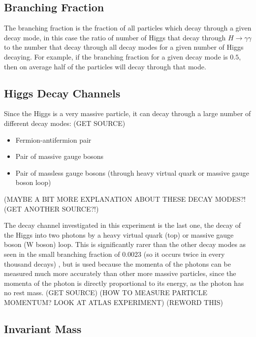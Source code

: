 \documentclass[11pt]{amsart}
\begin{document}
\begin{multicols}{2}
\subsection{Branching Fraction}
\label{sec:branching}

The branching fraction is the fraction of all particles which decay through a given decay mode, in this case the ratio of number of Higgs that decay through $H \to \gamma\gamma$ to the number that decay through all decay modes for a given number of Higgs decaying. For example, if the branching fraction for a given decay mode is $0.5$, then on average half of the particles will decay through that mode.

\subsection{Higgs Decay Channels}

Since the Higgs is a very massive particle, it can decay through a large number of different decay modes: (GET SOURCE)

\begin{itemize}
    \item Fermion-antifermion pair
    \item Pair of massive gauge bosons
    \item Pair of massless gauge bosons (through heavy virtual quark or massive gauge boson loop)
\end{itemize}

\cite{decaymodes1} \cite{decaymodes2}

(MAYBE A BIT MORE EXPLANATION ABOUT THESE DECAY MODES?! (GET ANOTHER SOURCE?!)

The decay channel investigated in this experiment is the last one, the decay of the Higgs into two photons by a heavy virtual quark (top) or massive gauge boson (W boson) loop. This is significantly rarer than the other decay modes as seen in the small branching fraction of 0.0023 (so it occurs twice in every thousand decays) \cite{HiggsCross1}, but is used because the momenta of the photons can be measured much more accurately than other more massive particles, since the momenta of the photon is directly proportional to its energy, as the photon has no rest mass. (GET SOURCE) (HOW TO MEASURE PARTICLE MOMENTUM? LOOK AT ATLAS EXPERIMENT) (REWORD THIS)

\subsection{Invariant Mass}
\label{sec:invariant}


\end{multicols}
\end{document}
